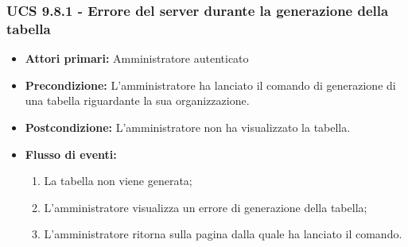 \subsubsection{UCS 9.8.1 - Errore del server durante la generazione della tabella}
\begin{itemize}
    \item \textbf{Attori primari:} Amministratore autenticato
    \item \textbf{Precondizione:} L'amministratore ha lanciato il comando di generazione di una tabella riguardante la sua organizzazione.
    \item \textbf{Postcondizione:} L'amministratore non ha visualizzato la tabella.
    \item \textbf{Flusso di eventi:} \begin{enumerate}
    \item La tabella non viene generata;
    \item L'amministratore visualizza un errore di generazione della tabella;
    \item L'amministratore ritorna sulla pagina dalla quale ha lanciato il comando.
    \end{enumerate}
\end{itemize}